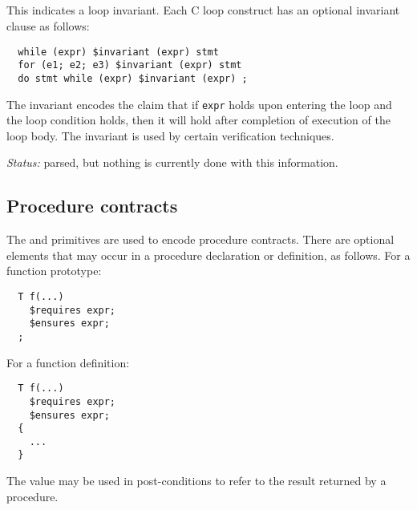 \documentclass[11pt]{book}
\begin{document}
%
%
%
%
%
%



\subsection{\cinvariant} This indicates a loop invariant.  Each C loop
construct has an optional invariant clause as follows:
\begin{verbatim}
  while (expr) $invariant (expr) stmt
  for (e1; e2; e3) $invariant (expr) stmt
  do stmt while (expr) $invariant (expr) ;
\end{verbatim}
The invariant encodes the claim that if \texttt{expr} holds upon
entering the loop and the loop condition holds, then it will hold
after completion of execution of the loop body.  The invariant is used
by certain verification techniques.

\emph{Status:} parsed, but nothing is currently done with this
information.

\subsection{Procedure contracts}
The \crequires{} and \censures{} primitives are used to encode
procedure contracts.  There are optional
elements that may occur in a procedure declaration or definition,
as follows.  For a function prototype:
\begin{verbatim}
  T f(...)
    $requires expr;
    $ensures expr;
  ;
\end{verbatim}
For a function definition:
\begin{verbatim}
  T f(...)
    $requires expr;
    $ensures expr;
  {
    ...
  }
\end{verbatim}
The value \cresult{} may be used in post-conditions to refer
to the result returned by a procedure.
\end{document}
